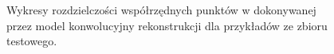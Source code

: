 \documentclass{article}
\begin{document}
\begin{figure}[H]
    \centering
    \qquad
    \qquad
    \caption{Wykresy rozdzielczości współrzędnych punktów w dokonywanej przez model konwolucyjny rekonstrukcji dla przykładów ze zbioru testowego.}
    \label{rys2}
\end{figure}
\end{document}
